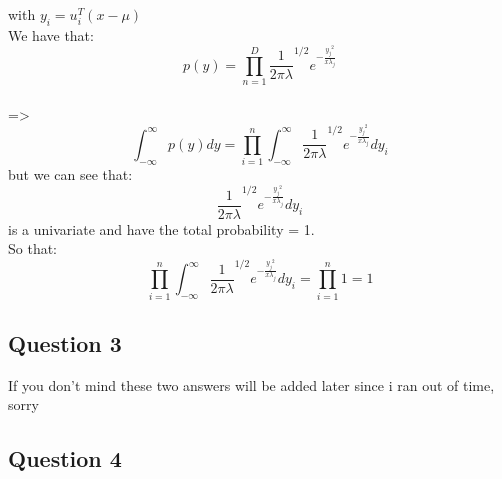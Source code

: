 \documentclass{article}
\begin{document}
        with $y_i = u_i^T (x - \mu)$ \\
        We have that:
        $$
            p(y) = \prod_{n=1}^{D} {\frac{1}{2 \pi \lambda}}^{1/2} e^{-\frac{{y_j}^2}{x \lambda_j}}
        $$ \\
        =>
        $$
            \int_{-\infty}^{\infty} p(y) dy = \prod_{i=1}^n \int_{-\infty}^{\infty} {\frac{1}{2 \pi \lambda}}^{1/2} e^{-\frac{{y_j}^2}{x \lambda_j}} d y_i
        $$
        but we can see that:
        $$
            {\frac{1}{2 \pi \lambda}}^{1/2} e^{-\frac{{y_j}^2}{x \lambda_j}} d y_i
        $$
        is a univariate and have the total probability = 1. \\
        So that:
        $$
             \prod_{i=1}^n \int_{-\infty}^{\infty} {\frac{1}{2 \pi \lambda}}^{1/2} e^{-\frac{{y_j}^2}{x \lambda_j}} d y_i = \prod_{i=1}^n 1 = 1
        $$

    \subsection{Question 3}
    If you don't mind these two answers will be added later since i ran out of time, sorry
    \subsection{Question 4}
\end{document}
